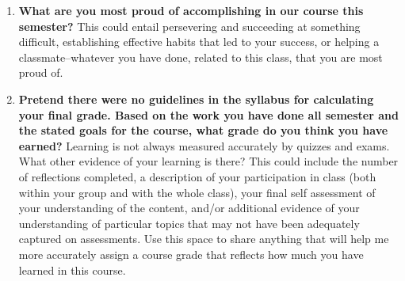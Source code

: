 \documentclass{article}
\begin{document}
\begin{enumerate}
\item \textbf{What are you most proud of accomplishing in our course this semester?} This could entail persevering and succeeding at something difficult, establishing effective habits that led to your success, or helping a classmate--whatever you have done, related to this class, that you are most proud of.

\item \textbf{Pretend there were no guidelines in the syllabus for calculating your final grade. Based on the work you have done all semester and the stated goals for the course, what grade do you think you have earned?} Learning is not always measured accurately by quizzes and exams. What other evidence of your learning is there? This could include the number of reflections completed, a description of your participation in class (both within your group and with the whole class), your final self assessment of your understanding of the content, and/or additional evidence of your understanding of particular topics that may not have been adequately captured on assessments. Use this space to share anything that will help me more accurately assign a course grade that reflects how much you have learned in this course.
\end{enumerate}
\end{document}
